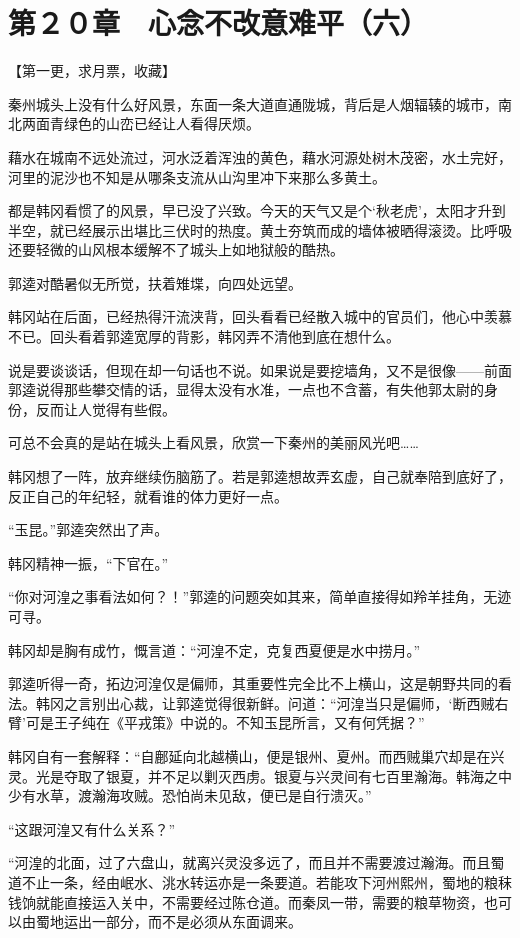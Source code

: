 \section{第２０章　心念不改意难平（六）}

【第一更，求月票，收藏】

秦州城头上没有什么好风景，东面一条大道直通陇城，背后是人烟辐辏的城市，南北两面青绿色的山峦已经让人看得厌烦。

藉水在城南不远处流过，河水泛着浑浊的黄色，藉水河源处树木茂密，水土完好，河里的泥沙也不知是从哪条支流从山沟里冲下来那么多黄土。

都是韩冈看惯了的风景，早已没了兴致。今天的天气又是个‘秋老虎’，太阳才升到半空，就已经展示出堪比三伏时的热度。黄土夯筑而成的墙体被晒得滚烫。比呼吸还要轻微的山风根本缓解不了城头上如地狱般的酷热。

郭逵对酷暑似无所觉，扶着雉堞，向四处远望。

韩冈站在后面，已经热得汗流浃背，回头看看已经散入城中的官员们，他心中羡慕不已。回头看着郭逵宽厚的背影，韩冈弄不清他到底在想什么。

说是要谈谈话，但现在却一句话也不说。如果说是要挖墙角，又不是很像——前面郭逵说得那些攀交情的话，显得太没有水准，一点也不含蓄，有失他郭太尉的身份，反而让人觉得有些假。

可总不会真的是站在城头上看风景，欣赏一下秦州的美丽风光吧……

韩冈想了一阵，放弃继续伤脑筋了。若是郭逵想故弄玄虚，自己就奉陪到底好了，反正自己的年纪轻，就看谁的体力更好一点。

“玉昆。”郭逵突然出了声。

韩冈精神一振，“下官在。”

“你对河湟之事看法如何？！”郭逵的问题突如其来，简单直接得如羚羊挂角，无迹可寻。

韩冈却是胸有成竹，慨言道：“河湟不定，克复西夏便是水中捞月。”

郭逵听得一奇，拓边河湟仅是偏师，其重要性完全比不上横山，这是朝野共同的看法。韩冈之言别出心裁，让郭逵觉得很新鲜。问道：“河湟当只是偏师，‘断西贼右臂’可是王子纯在《平戎策》中说的。不知玉昆所言，又有何凭据？”

韩冈自有一套解释：“自鄜延向北越横山，便是银州、夏州。而西贼巢穴却是在兴灵。光是夺取了银夏，并不足以剿灭西虏。银夏与兴灵间有七百里瀚海。韩海之中少有水草，渡瀚海攻贼。恐怕尚未见敌，便已是自行溃灭。”

“这跟河湟又有什么关系？”

“河湟的北面，过了六盘山，就离兴灵没多远了，而且并不需要渡过瀚海。而且蜀道不止一条，经由岷水、洮水转运亦是一条要道。若能攻下河州熙州，蜀地的粮秣钱饷就能直接运入关中，不需要经过陈仓道。而秦凤一带，需要的粮草物资，也可以由蜀地运出一部分，而不是必须从东面调来。

